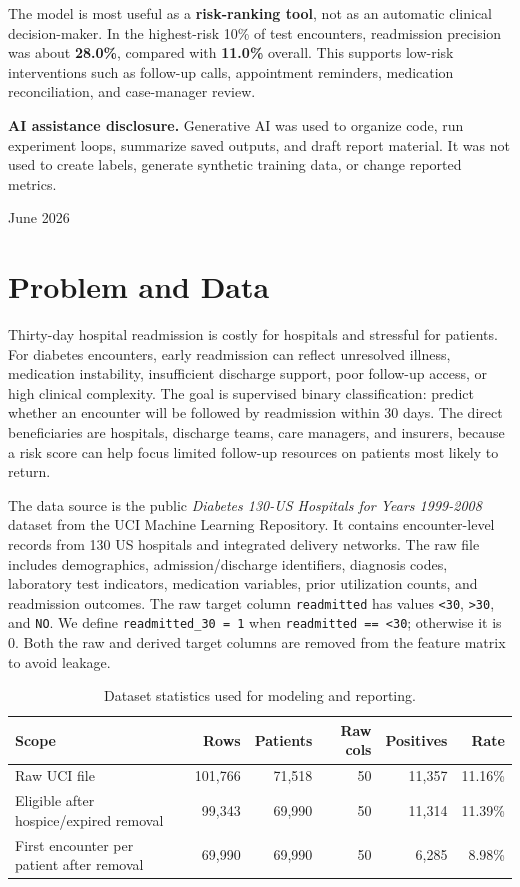 \documentclass[10pt]{article}
\newcommand{\tightsection}[1]{\vspace{3pt}\section{#1}\vspace{-3pt}}
\begin{document}
\begin{titlepage}
The model is most useful as a \textbf{risk-ranking tool}, not as an automatic clinical decision-maker. In the highest-risk 10\% of test encounters, readmission precision was about \textbf{28.0\%}, compared with \textbf{11.0\%} overall. This supports low-risk interventions such as follow-up calls, appointment reminders, medication reconciliation, and case-manager review.

\textbf{AI assistance disclosure.} Generative AI was used to organize code, run experiment loops, summarize saved outputs, and draft report material. It was not used to create labels, generate synthetic training data, or change reported metrics.

\vfill
\begin{center}
June 2026
\end{center}
\end{titlepage}
\nopagecolor

\setcounter{page}{1}

\tightsection{Problem and Data}

Thirty-day hospital readmission is costly for hospitals and stressful for patients. For diabetes encounters, early readmission can reflect unresolved illness, medication instability, insufficient discharge support, poor follow-up access, or high clinical complexity. The goal is supervised binary classification: predict whether an encounter will be followed by readmission within 30 days. The direct beneficiaries are hospitals, discharge teams, care managers, and insurers, because a risk score can help focus limited follow-up resources on patients most likely to return.

The data source is the public \textit{Diabetes 130-US Hospitals for Years 1999-2008} dataset from the UCI Machine Learning Repository. It contains encounter-level records from 130 US hospitals and integrated delivery networks. The raw file includes demographics, admission/discharge identifiers, diagnosis codes, laboratory test indicators, medication variables, prior utilization counts, and readmission outcomes. The raw target column \texttt{readmitted} has values \texttt{<30}, \texttt{>30}, and \texttt{NO}. We define \texttt{readmitted\_30 = 1} when \texttt{readmitted == <30}; otherwise it is 0. Both the raw and derived target columns are removed from the feature matrix to avoid leakage.

\begin{table}[H]
\centering
\caption{Dataset statistics used for modeling and reporting.}
\small
\begin{tabularx}{0.96\textwidth}{Yrrrrr}
\toprule
Scope & Rows & Patients & Raw cols & Positives & Rate \\
\midrule
Raw UCI file & 101,766 & 71,518 & 50 & 11,357 & 11.16\% \\
Eligible after hospice/expired removal & 99,343 & 69,990 & 50 & 11,314 & 11.39\% \\
First encounter per patient after removal & 69,990 & 69,990 & 50 & 6,285 & 8.98\% \\
\bottomrule
\end{tabularx}
\end{table}
\end{document}

